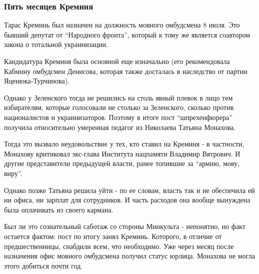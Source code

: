  
 
 
 
 

\subsubsection{Пять месяцев Креминя}

Тарас Креминь был назначен на должность мовного омбудсмена 8 июля. Это бывший
депутат от \enquote{Народного фронта}, который к тому же является соавтором закона о
тотальной украинизации.

Кандидатура Креминя была основной еще изначально (его рекомендовала Кабмину
омбудсмен Денисова, которая также досталась в наследство от партии
Яценюка-Турчинова).

Однако у Зеленского тогда не решились на столь явный плевок в лицо тем
избирателям, которые голосовали не столько за Зеленского, сколько против
националистов и украинизаторов. Поэтому в итоге пост \enquote{шпрехенфюрера} получила
относительно умеренная педагог из Николаева Татьяна Монахова. 

Тогда это вызвало неудовольствие у тех, кто ставил на Креминя - в частности,
Монахову критиковал экс-глава Института нацпамяти Владимир Вятрович. И другие
представители предыдущей власти, ранее топившие за \enquote{армию, мову, виру}. 

Однако позже Татьяна решила уйти - по ее словам, власть так и не обеспечила ей
ни офиса, ни зарплат для сотрудников. И часть расходов она вообще вынуждена
была оплачивать из своего кармана. 

Был ли это сознательный саботаж со стороны Минкульта - непонятно, но факт
остается фактом: пост по итогу занял Креминь. Которого, в отличие от
предшественницы, снабдили всем, что необходимо. Уже через месяц после
назначения офис мовного омбудсмена получил статус юрлица. Монахова не могла
этого добиться почти год. 

